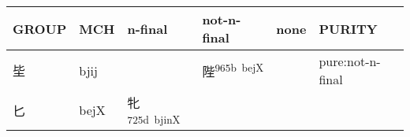 \documentclass[14pt,a4paper]{scrartcl}
\begin{document}
\begin{longtable}[c]{@{}llllll@{}}
\toprule
\begin{minipage}[b]{0.14\columnwidth}\raggedright\strut
GROUP
\strut\end{minipage} &
\begin{minipage}[b]{0.14\columnwidth}\raggedright\strut
MCH
\strut\end{minipage} &
\begin{minipage}[b]{0.14\columnwidth}\raggedright\strut
n-final
\strut\end{minipage} &
\begin{minipage}[b]{0.14\columnwidth}\raggedright\strut
not-n-final
\strut\end{minipage} &
\begin{minipage}[b]{0.14\columnwidth}\raggedright\strut
none
\strut\end{minipage} &
\begin{minipage}[b]{0.14\columnwidth}\raggedright\strut
PURITY
\strut\end{minipage}\tabularnewline
\midrule
\endhead
\begin{minipage}[t]{0.14\columnwidth}\raggedright\strut
坒
\strut\end{minipage} &
\begin{minipage}[t]{0.14\columnwidth}\raggedright\strut
bjij
\strut\end{minipage} &
\begin{minipage}[t]{0.14\columnwidth}\raggedright\strut
\strut\end{minipage} &
\begin{minipage}[t]{0.14\columnwidth}\raggedright\strut
陛\textsuperscript{965b~bejX}
\strut\end{minipage} &
\begin{minipage}[t]{0.14\columnwidth}\raggedright\strut
\strut\end{minipage} &
\begin{minipage}[t]{0.14\columnwidth}\raggedright\strut
pure:not-n-final
\strut\end{minipage}\tabularnewline
\begin{minipage}[t]{0.14\columnwidth}\raggedright\strut
匕
\strut\end{minipage} &
\begin{minipage}[t]{0.14\columnwidth}\raggedright\strut
bejX
\strut\end{minipage} &
\begin{minipage}[t]{0.14\columnwidth}\raggedright\strut
牝\textsuperscript{725d~bjinX}
\strut\end{minipage} &

\end{longtable}
\end{document}
